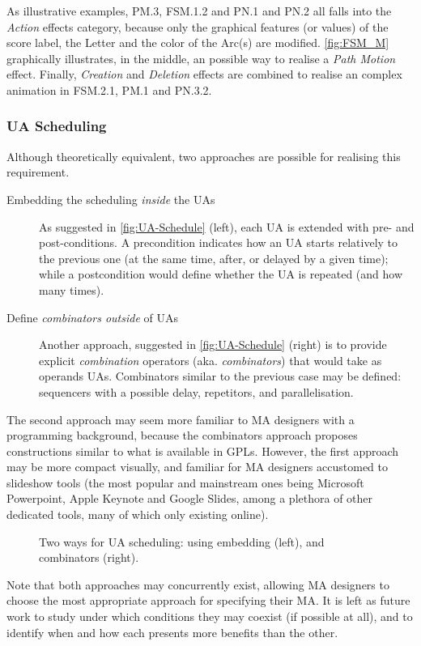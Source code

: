 As illustrative examples, \textsf{PM.3}, \textsf{FSM.1.2} and \textsf{PN.1} and \textsf{PN.2}
all falls into the \emph{Action} effects category, because only the graphical 
features (or values) of the score label, the \textsf{Letter} and the color of the
\textsf{Arc}(s) are modified. \autoref{fig:FSM_M} graphically illustrates,
in the middle, an possible way to realise a \emph{Path Motion} effect. Finally,
\emph{Creation} and \emph{Deletion} effects are combined to realise an complex 
animation in \textsf{FSM.2.1}, \textsf{PM.1} and \textsf{PN.3.2}. 

\subsubsection{UA Scheduling}
\label{sec:MA-Scheduling}

Although theoretically equivalent, two approaches are possible for realising
this requirement.
\begin{description}
   \item[Embedding the scheduling \emph{inside} the UAs] As suggested in 
   \autoref{fig:UA-Schedule} (left), each UA is extended with pre- and 
   post-conditions. A precondition indicates how an UA starts relatively to the 
   previous one (at the same time, after, or delayed by a given time); while a
   postcondition would define whether the UA is repeated (and how many times).
   
   \item[Define \emph{combinators outside} of UAs] Another approach, suggested
   in \autoref{fig:UA-Schedule} (right) is to provide explicit \emph{combination}
   operators (aka. \emph{combinators}) that would take as operands UAs. Combinators
   similar to the previous case may be defined: sequencers with a possible delay,
   repetitors, and parallelisation. 
\end{description}
The second approach may seem more familiar to MA designers with a programming 
background, because the combinators approach proposes constructions similar to
what is available in GPLs. However, the first approach may be more compact visually,
and familiar for MA designers accustomed to slideshow tools (the most popular and
mainstream ones being Microsoft Powerpoint, Apple Keynote and Google Slides, among
a plethora of other dedicated tools, many of which only existing online).

\begin{figure}[t]%
   \centering
   \caption{Two ways for UA scheduling: using embedding (left), and combinators (right).
   }%
   \label{fig:UA-Schedule}%
\end{figure}

Note that both approaches may concurrently exist, allowing MA designers to choose
the most appropriate approach for specifying their MA. It is left as future work
to study under which conditions they may coexist (if possible at all), and to 
identify when and how each presents more benefits than the other.

